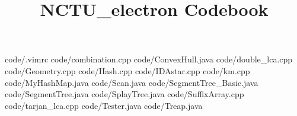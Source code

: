 \documentclass {article}
\begin{document}
\title {NCTU_electron Codebook}
 {code/.vimrc}
 {code/combination.cpp}
 {code/ConvexHull.java}
 {code/double_lca.cpp}
 {code/Geometry.cpp}
 {code/Hash.cpp}
 {code/IDAstar.cpp}
 {code/km.cpp}
 {code/MyHashMap.java}
 {code/Scan.java}
 {code/SegmentTree_Basic.java}
 {code/SegmentTree.java}
 {code/SplayTree.java}
 {code/SuffixArray.cpp}
 {code/tarjan_lca.cpp}
 {code/Tester.java}
 {code/Treap.java}
\end{document}
